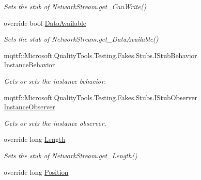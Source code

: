 \begin{DoxyCompactItemize}
\begin{DoxyCompactList}\small\item\em Sets the stub of Network\-Stream.\-get\-\_\-\-Can\-Write()\end{DoxyCompactList}\item 
override bool \hyperlink{class_system_1_1_net_1_1_sockets_1_1_fakes_1_1_stub_network_stream_af8bd9c5a7466f14ad91980e1b9cd5183}{Data\-Available}
\begin{DoxyCompactList}\small\item\em Sets the stub of Network\-Stream.\-get\-\_\-\-Data\-Available()\end{DoxyCompactList}\item 
mqttf\-::\-Microsoft.\-Quality\-Tools.\-Testing.\-Fakes.\-Stubs.\-I\-Stub\-Behavior \hyperlink{class_system_1_1_net_1_1_sockets_1_1_fakes_1_1_stub_network_stream_a5eb8f4b229b6cc46d1ef6fef8da30ed6}{Instance\-Behavior}
\begin{DoxyCompactList}\small\item\em Gets or sets the instance behavior.\end{DoxyCompactList}\item 
mqttf\-::\-Microsoft.\-Quality\-Tools.\-Testing.\-Fakes.\-Stubs.\-I\-Stub\-Observer \hyperlink{class_system_1_1_net_1_1_sockets_1_1_fakes_1_1_stub_network_stream_af4a1621ac342d9d363c01ed7ead7f488}{Instance\-Observer}
\begin{DoxyCompactList}\small\item\em Gets or sets the instance observer.\end{DoxyCompactList}\item 
override long \hyperlink{class_system_1_1_net_1_1_sockets_1_1_fakes_1_1_stub_network_stream_a10b5f6650563f9f4b44dfd706ba6af00}{Length}
\begin{DoxyCompactList}\small\item\em Sets the stub of Network\-Stream.\-get\-\_\-\-Length()\end{DoxyCompactList}\item 
override long \hyperlink{class_system_1_1_net_1_1_sockets_1_1_fakes_1_1_stub_network_stream_aba1260225efb4ae8dacd92df5cc51a39}{Position}

\end{DoxyCompactItemize}
